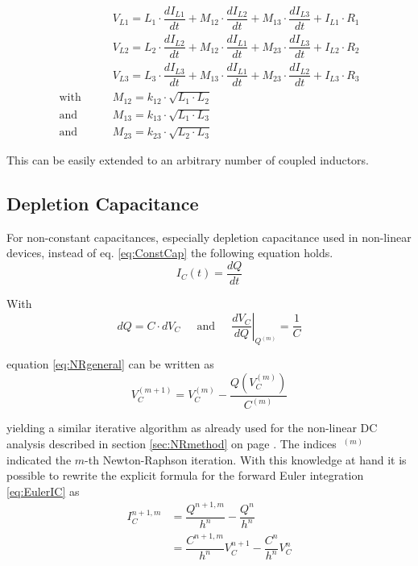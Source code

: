 \begin{align}
 & V_{L1} = L_1\cdot\dfrac{d I_{L1}}{d t} + M_{12}\cdot\dfrac{d I_{L2}}{d t}
          + M_{13}\cdot\dfrac{d I_{L3}}{d t} + I_{L1}\cdot R_1 \\
 & V_{L2} = L_2\cdot\dfrac{d I_{L2}}{d t} + M_{12}\cdot\dfrac{d I_{L1}}{d t}
          + M_{23}\cdot\dfrac{d I_{L3}}{d t} + I_{L2}\cdot R_2 \\
 & V_{L3} = L_3\cdot\dfrac{d I_{L3}}{d t} + M_{13}\cdot\dfrac{d I_{L1}}{d t}
          + M_{23}\cdot\dfrac{d I_{L2}}{d t} + I_{L3}\cdot R_3 \\
\text{with}\qquad & M_{12} = k_{12}\cdot\sqrt{L_1\cdot L_2} \\
\text{and}\qquad  & M_{13} = k_{13}\cdot\sqrt{L_1\cdot L_3} \\
\text{and}\qquad  & M_{23} = k_{23}\cdot\sqrt{L_2\cdot L_3}
\end{align}

This can be easily extended to an arbitrary number of coupled
inductors.


\subsection{Depletion Capacitance}

For non-constant capacitances, especially depletion capacitance used
in non-linear devices, instead of eq. \eqref{eq:ConstCap} the
following equation holds.
\begin{equation}
I_C(t) = \dfrac{d Q}{d t}
\end{equation}

With
\begin{equation}
d Q = C\cdot d V_C
\;\;\;\; \textrm{ and } \;\;\;\;
\left.\dfrac{d V_C}{d Q}\right|_{Q^{(m)}} = \dfrac{1}{C}
\end{equation}

equation \eqref{eq:NRgeneral} can be written as
\begin{equation}
V_C^{(m + 1)} = V_C^{(m)} - \dfrac{Q\left(V_C^{(m)}\right)}{C^{(m)}}
\end{equation}

yielding a similar iterative algorithm as already used for the
non-linear DC analysis described in section \ref{sec:NRmethod} on page
\pageref{sec:NRmethod}.  The indices $~^{(m)}$ indicated the $m$-th
Newton-Raphson iteration.  With this knowledge at hand it is possible
to rewrite the explicit formula for the forward Euler integration
\eqref{eq:EulerIC} as
\begin{equation}
\begin{split}
I_C^{n+1,m} &= \dfrac{Q^{n+1,m}}{h^{n}} - \dfrac{Q^{n}}{h^{n}}\\
&= \dfrac{C^{n+1,m}}{h^{n}} V_C^{n+1} - \dfrac{C^{n}}{h^{n}} V_C^{n}
\end{split}
\end{equation}

